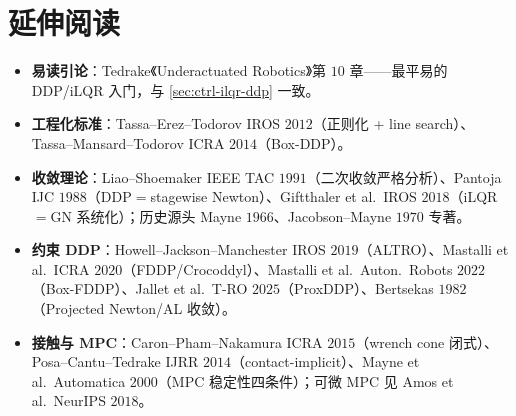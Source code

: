 \section*{延伸阅读}
\begin{itemize}
  \item \textbf{易读引论}：Tedrake《Underactuated Robotics》第 $10$ 章\cite{tedrake_underactuated}——最平易的 DDP/iLQR 入门，与 \cref{sec:ctrl-ilqr-ddp} 一致。
  \item \textbf{工程化标准}：Tassa--Erez--Todorov IROS $2012$\cite{tassa2012ilqg}（正则化 + line search）、Tassa--Mansard--Todorov ICRA $2014$\cite{tassa2014ddp}（Box-DDP）。
  \item \textbf{收敛理论}：Liao--Shoemaker IEEE TAC $1991$\cite{liao1991convergence}（二次收敛严格分析）、Pantoja IJC $1988$\cite{pantoja1988ddp}（DDP$=$stagewise Newton）、Giftthaler et al.\ IROS $2018$\cite{giftthaler2018gnms}（iLQR$=$GN 系统化）；历史源头 Mayne $1966$\cite{mayne1966ddp}、Jacobson--Mayne $1970$ 专著\cite{jacobson1970ddp}。
  \item \textbf{约束 DDP}：Howell--Jackson--Manchester IROS $2019$\cite{howell2019altro}（ALTRO）、Mastalli et al.\ ICRA $2020$\cite{mastalli2020crocoddyl}（FDDP/Crocoddyl）、Mastalli et al.\ Auton.\ Robots $2022$\cite{mastalli2022boxfddp}（Box-FDDP）、Jallet et al.\ T-RO $2025$\cite{jallet2025proxddp}（ProxDDP）、Bertsekas $1982$\cite{bertsekas1982projected}（Projected Newton/AL 收敛）。
  \item \textbf{接触与 MPC}：Caron--Pham--Nakamura ICRA $2015$\cite{caron2015wrench}（wrench cone 闭式）、Posa--Cantu--Tedrake IJRR $2014$\cite{posa2014contact}（contact-implicit）、Mayne et al.\ Automatica $2000$\cite{mayne2000constrained}（MPC 稳定性四条件）；可微 MPC 见 Amos et al.\ NeurIPS $2018$\cite{amos2018diffmpc}。
\end{itemize}

